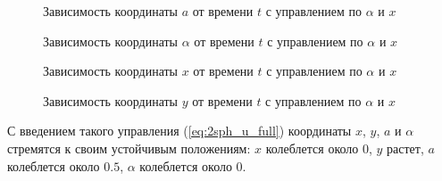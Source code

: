 \begin{figure}[H]
	\caption{Зависимость координаты $a$ от времени $t$ с управлением по $\alpha$ и $x$}
	\label{ris:2sph_a_full_u}
\end{figure}
\begin{figure}[H]
	\caption{Зависимость координаты $\alpha$ от времени $t$ с управлением по $\alpha$ и $x$}
	\label{ris:2sph_alpha_full_u}
\end{figure} 
\begin{figure}[H]
	\caption{Зависимость координаты $x$ от времени $t$ с управлением по $\alpha$ и $x$}
	\label{ris:2sph_x_full_u}
\end{figure} 
\begin{figure}[H]
	\caption{Зависимость координаты $y$ от времени $t$ с управлением по $\alpha$ и $x$}
	\label{ris:2sph_y_full_u}
\end{figure} 

С введением такого управления (\ref{eq:2sph_u_full}) координаты $x$, $y$, $a$ и $\alpha$ стремятся к своим устойчивым положениям: $x$ колеблется около 0, $y$ растет,  $a$ колеблется около $0.5$, $\alpha$ колеблется около 0.
